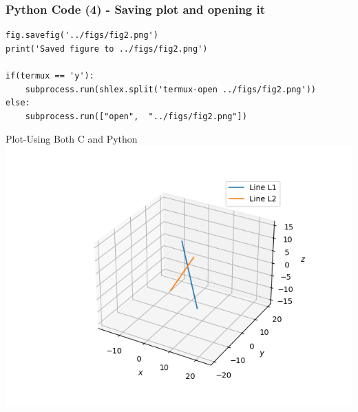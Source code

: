 \documentclass{beamer}
\begin{document}
\begin{frame}[fragile]
    \frametitle{Python Code (4) - Saving plot and opening it}
    \begin{lstlisting}
fig.savefig('../figs/fig2.png')
print('Saved figure to ../figs/fig2.png')

if(termux == 'y'):
    subprocess.run(shlex.split('termux-open ../figs/fig2.png'))
else:
    subprocess.run(["open",  "../figs/fig2.png"])
\end{lstlisting}
\end{frame}

\begin{frame}{Plot-Using Both C and Python}
    \centering
    \includegraphics[width=\columnwidth, height=0.8\textheight, keepaspectratio]{../figs/fig2.png}     
\end{frame}
\end{document}

